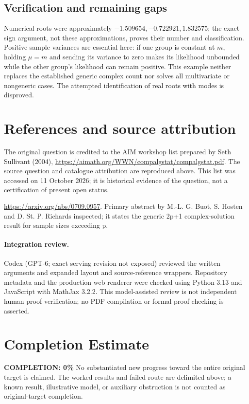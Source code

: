 \documentclass[11pt]{article}
\begin{document}
\subsection{Verification and remaining gaps}
Numerical roots were approximately $-1.509654,-0.722921,1.832575$; the exact sign argument, not these approximations, proves their number and classification. Positive sample variances are essential here: if one group is constant at $m$, holding $\mu=m$ and sending its variance to zero makes its likelihood unbounded while the other group's likelihood can remain positive. This example neither replaces the established generic complex count nor solves all multivariate or nongeneric cases. The attempted identification of real roots with modes is disproved.

\section{References and source attribution}
The original question is credited to the AIM workshop list prepared by Seth Sullivant (2004), \url{https://aimath.org/WWN/compalgstat/compalgstat.pdf}. The source question and catalogue attribution are reproduced above. This list was accessed on 11 October 2026; it is historical evidence of the question, not a certification of present open status.

\url{https://arxiv.org/abs/0709.0957}. Primary abstract by M.-L. G. Buot, S. Hosten and D. St. P. Richards inspected; it states the generic 2p+1 complex-solution result for sample sizes exceeding p.


\paragraph{Integration review.} Codex (GPT-6; exact serving revision not exposed) reviewed the written arguments and expanded layout and source-reference wrappers. Repository metadata and the production web renderer were checked using Python 3.13 and JavaScript with MathJax 3.2.2. This model-assisted review is not independent human proof verification; no PDF compilation or formal proof checking is asserted.

\section{Completion Estimate}
\noindent\textbf{COMPLETION: 0\%}
No substantiated new progress toward the entire original target is claimed. The worked results and failed route are delimited above; a known result, illustrative model, or auxiliary obstruction is not counted as original-target completion.
\end{document}
